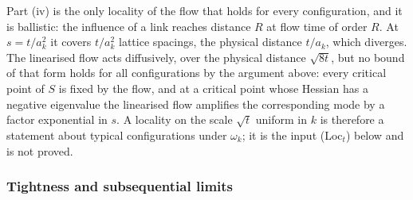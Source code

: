 Part (iv) is the only locality of the flow that holds for every
configuration, and it is ballistic: the influence of a link reaches distance
$R$ at flow time of order $R$. At $s=t/a_k^2$ it covers $t/a_k^2$ lattice
spacings, the physical distance $t/a_k$, which diverges. The linearised flow
acts diffusively, over the physical distance $\sqrt{8t}$, but no
bound of that form holds for all configurations by the argument above: every
critical point of $S$ is fixed by the flow, and at a critical point whose
Hessian has a negative eigenvalue the linearised flow amplifies the
corresponding mode by a factor exponential in $s$. A locality on the scale
$\sqrt t$ uniform in $k$ is therefore a statement about typical
configurations under $\omega_k$; it is the input (Loc$_t$) below and is not
proved.
\subsubsection{Tightness and subsequential limits}

